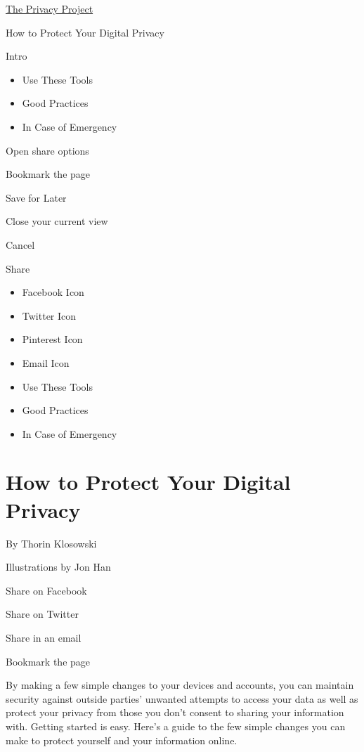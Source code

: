 \href{https://www.nytimes3xbfgragh.onion/interactive/2019/opinion/internet-privacy-project.html}{The
Privacy Project}

How to Protect Your Digital Privacy

Intro

\begin{itemize}
\tightlist
\item
  Use These Tools
\item
  Good Practices
\item
  In Case of Emergency
\end{itemize}

Open share options

Bookmark the page

Save for Later

Close your current view

Cancel

Share

\begin{itemize}
\tightlist
\item
  Facebook Icon
\item
  Twitter Icon
\item
  Pinterest Icon
\item
  Email Icon
\end{itemize}

\begin{itemize}
\tightlist
\item
  Use These Tools
\item
  Good Practices
\item
  In Case of Emergency
\end{itemize}

\hypertarget{how-to-protect-your-digital-privacy}{%
\section{How to Protect Your Digital
Privacy}\label{how-to-protect-your-digital-privacy}}

By Thorin Klosowski

Illustrations by Jon Han

Share on Facebook

Share on Twitter

Share in an email

Bookmark the page

By making a few simple changes to your devices and accounts, you can
maintain security against outside parties' unwanted attempts to access
your data as well as protect your privacy from those you don't consent
to sharing your information with. Getting started is easy. Here's a
guide to the few simple changes you can make to protect yourself and
your information online.~

